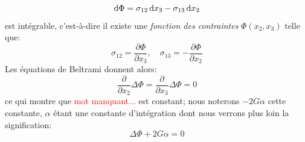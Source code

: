 \begin{equation}
    \mathop{\mathrm{{}d}}\mathopen{} \Phi = \sigma_{12} \mathop{\mathrm{{}d}}\mathopen{} x_3 - \sigma_{13} \mathop{\mathrm{{}d}}\mathopen{} x_2
    \label{eq:Ch07-051}
\end{equation}
est intégrable, c'est-à-dire il existe une \emph{fonction des contraintes} $\Phi\left( x_2, x_3 \right)$ telle que:
\begin{equation}
    \sigma_{12} = \frac{\partial \Phi}{\partial x_3} , \quad \sigma_{13} = - \frac{\partial \Phi}{\partial x_2}
    \label{eq:Ch07-052}
\end{equation}
Les équations de Beltrami donnent alors:
\begin{equation}
    \frac{\partial}{\partial x_2} \Delta \Phi = \frac{\partial}{\partial x_3} \Delta \Phi = 0
    \label{eq:Ch07-053}
\end{equation}
ce qui montre que \textcolor{red}{mot manquant...} est constant; nous noterons $-2G\alpha$ cette constante, $\alpha$ étant une constante d'intégration dont nous verrons plus loin la signification:
\begin{equation}
    \Delta \Phi + 2 G \alpha = 0
    \label{eq:Ch07-054}
\end{equation}

